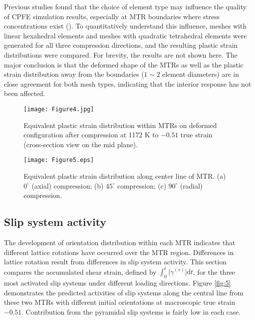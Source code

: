 \documentclass[review]{elsarticle}
\begin{document}
	Previous studies found that the choice of element type may influence the quality of CPFE simulation results, especially at MTR boundaries where stress concentrations exist (\cite{r28}).
	To quantitatively understand this influence, meshes with linear hexahedral elements and meshes with quadratic tetrahedral elements were generated for all three compression directions, and the resulting plastic strain distributions were compared.
	For brevity, the results are not shown here.
	The major conclusion is that the deformed shape of the MTRs as well as the plastic strain distribution away from the boundaries ($1\sim 2$ element diameters) are in close agreement for both mesh types, indicating that the interior response has not been affected.
	
	\begin{figure}[!htb]
	\centering
	\texttt{[image: Figure4.jpg]}
	\caption{\label{fig:3}Equivalent plastic strain distribution within MTRs on deformed configuration after compression at 1172 K to $-0.51$ true strain (cross-section view on the mid plane).}
	\end{figure}
	\begin{figure}[!htb]
	\centering
	\texttt{[image: Figure5.eps]}
	\caption{\label{fig:4}Equivalent plastic strain distribution along center line of MTR. (a) $0^{\circ}$ (axial) compression; (b) $45^{\circ}$ compression; (c) $90^{\circ}$ (radial) compression.}
	\end{figure}
	\subsection{Slip system activity}
	\label{slip}
	The development of orientation distribution within each MTR indicates that different lattice rotations have occurred over the MTR region.
    Differences in lattice rotation result from differences in slip system activity.
    This section compares the accumulated shear strain, defined by $\int_{0}^{t} \vert \dot{\gamma}^{(s)} \vert \text{d}t$, for the three most activated slip systems under different loading directions.
    Figure \ref{fig:5} demonstrates the predicted activities of slip systems along the central line from these two MTRs with different initial orientations at macroscopic true strain $-0.51$.
	Contribution from the pyramidal slip systems is fairly low in each case.
	
\end{document}

